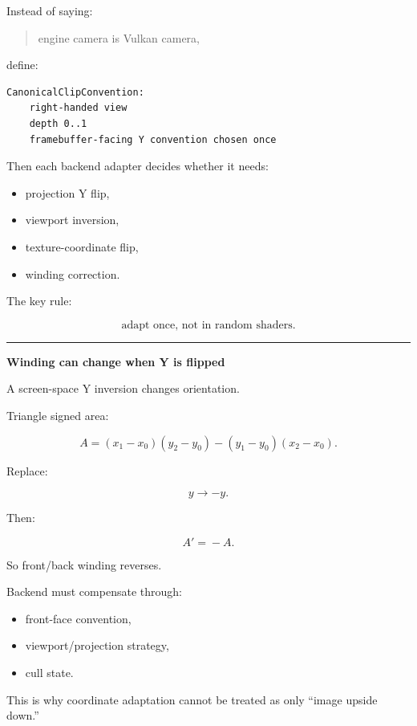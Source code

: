 Instead of saying:

\begin{quote}
engine camera is Vulkan camera,
\end{quote}

define:

\begin{verbatim}
CanonicalClipConvention:
    right-handed view
    depth 0..1
    framebuffer-facing Y convention chosen once
\end{verbatim}

Then each backend adapter decides whether it needs:

\begin{itemize}
\tightlist
\item
  projection Y flip,
\item
  viewport inversion,
\item
  texture-coordinate flip,
\item
  winding correction.
\end{itemize}

The key rule:

\[
\boxed{
\text{adapt once, not in random shaders}.
}
\]

\begin{center}\rule{0.5\linewidth}{0.5pt}\end{center}

\textbf{Winding can change when Y is flipped}

A screen-space Y inversion changes orientation.

Triangle signed area:

\[
A=
(x_1-x_0)(y_2-y_0)
-
(y_1-y_0)(x_2-x_0).
\]

Replace:

\[
y\rightarrow-y.
\]

Then:

\[
A'\!=\!-A.
\]

So front/back winding reverses.

Backend must compensate through:

\begin{itemize}
\tightlist
\item
  front-face convention,
\item
  viewport/projection strategy,
\item
  cull state.
\end{itemize}

This is why coordinate adaptation cannot be treated as only ``image upside down.''

